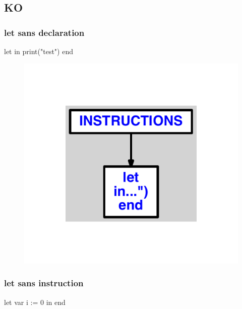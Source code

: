 \documentclass{article}
\begin{document}
\subsection{KO}
\subsubsection{let sans declaration}
\begin{verbatimtab}
let
in
	print("test")
end
\end{verbatimtab}
\begin{figure}[H]\centering\includegraphics[max width=\textwidth]{ast/ast_258.pdf}\end{figure}\subsubsection{let sans instruction}
\begin{verbatimtab}
let
	var i := 0
in
end
\end{verbatimtab}
\end{document}
